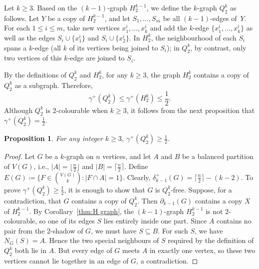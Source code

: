 \documentclass[11pt]{article}
\newtheorem{proposition}[theorem]{Proposition}
\begin{document}
Let $k\ge 3$. Based on the $(k-1)$-graph $H_2^{k-1}$, we define the $k$-graph $Q_2^k$  as follows.
Let $Y$ be a copy of $H_2^{k-1}$, and let $S_1,\dots,S_m$ be all $(k-1)$-edges of~$Y$.
For each $1\le i\le m$, take new vertices $x_1^i,\dots,x_k^i$ and add the $k$-edge $\{x_1^i,\dots,x_k^i\}$ as well as the edges $S_i\cup\{x_1^i\}$ and $S_i\cup\{x_2^i\}$.
In $H_2^k$, the neighbourhood of each $S_i$ spans a $k$-edge (all $k$ of its vertices being joined to $S_i$); in $Q_2^k$, by contrast, only two vertices of this $k$-edge are joined to $S_i$.


By the definitions of $Q_2^k$ and $H_2^k$, for any $k\ge 3$, the graph $H_2^k$ contains a copy of $Q_2^k$ as a subgraph. Therefore,
\[
\gamma^+(Q_2^k)\le \gamma^+(H_2^k)\le \frac{1}{2}.
\]
Although $Q_2^k$ is 2-colourable when $k\ge 3$, it follows from the next proposition that $\gamma^+(Q_2^k)=\frac{1}{2}$.
\begin{proposition}\label{pro:F graph}
For any integer $k\ge 3$, $\gamma^+(Q_2^k)\ge \frac{1}{2}$.
\end{proposition}
\begin{proof}
    Let $G$ be a $k$-graph on $n$ vertices, and let $A$ and $B$ be a balanced partition of $V(G)$, i.e., $|A|=\lfloor\frac{n}{2}\rfloor$ and $|B|=\lceil\frac{n}{2}\rceil$.
    Define $E(G)\coloneqq\{F\in\binom{V(G)}{k}: |F\cap A|=1\}$. Clearly, $\delta^+_{k-1}(G)=\lceil\frac{n}{2}\rceil-(k-2)$.
    To prove $\gamma^+(Q_2^k)\ge \frac{1}{2}$, it is enough to show that $G$ is $Q_2^k$-free.
    Suppose, for a contradiction, that $G$ contains a copy of $Q_2^k$. Then $\partial_{k-1}(G)$ contains a copy $X$ of $H_2^{k-1}$.
    By Corollary~\ref{thm:H graph}, the $(k-1)$-graph $H_2^{k-1}$ is not $2$-colourable, so one of its edges $S$ lies entirely inside one part. Since $A$ contains no pair from the 2-shadow of $G$, we must have $S\subseteq B$.
    For such $S$, we have $N_G(S)=A$. Hence the two special neighbours of $S$ required by the definition of $Q_2^k$ both lie in $A$.
    But every edge of $G$ meets $A$ in exactly one vertex, so these two vertices cannot lie together in an edge of $G$, a contradiction.
\end{proof}
\end{document}
